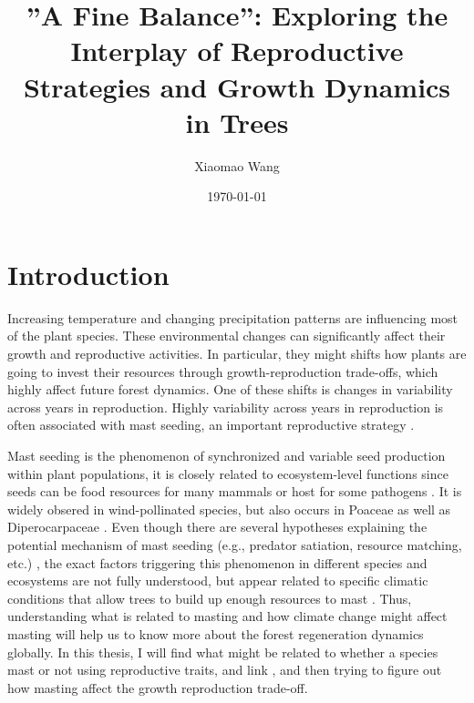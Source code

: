 \documentclass[11pt,letter]{article}
\begin{document}
\renewcommand{\refname}{\CHead{}}

\title{”A Fine Balance'': Exploring the Interplay of Reproductive Strategies and Growth Dynamics in Trees}
\author{Xiaomao Wang} 
\date{\today}
\maketitle

\setlength{\parindent}{0pt}
\setlength{\parskip}{3pt}

\section{Introduction}
Increasing temperature and changing precipitation patterns are influencing most of the plant species. These environmental changes can significantly affect their growth and reproductive activities. In particular, they might shifts how plants are going to invest their resources through growth-reproduction trade-offs, which highly affect future forest dynamics. One of these shifts is changes in variability across years in reproduction. Highly variability across years in reproduction is often associated with mast seeding, an important reproductive strategy \citep{pearse2016mechanisms}.\par
Mast seeding is the phenomenon of synchronized and variable seed production within plant populations, it is closely related to ecosystem-level functions since seeds can be food resources for many mammals or host for some pathogens  \citep{janzen1971seed, kelly1994evolutionary, davies2024seed}. It is widely obsered in wind-pollinated species, but also occurs in Poaceae as well as Diperocarpaceae  \citep{kelly2002mast}. Even though there are several hypotheses explaining the potential mechanism of mast seeding (e.g., predator satiation, resource matching, etc.)  \citep{koenig2021brief}, the exact factors triggering this phenomenon in different species and ecosystems are not fully understood, but appear related to specific climatic conditions that allow trees to build up enough resources to mast  \citep{pearse2016mechanisms}. Thus, understanding what is related to masting and how climate change might affect masting will help us to know more about the forest regeneration dynamics globally. In this thesis, I will find what might be related to whether a species mast or not using reproductive traits, and link , and then trying to figure out how masting affect the growth reproduction trade-off.
\end{document}
